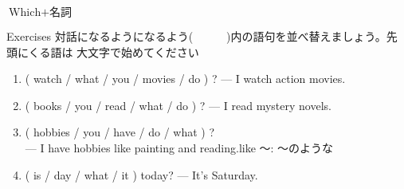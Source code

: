\documentclass[aspectratio=169,xcolor={dvipsnames,table}]{beamer}
\begin{document}
\begin{frame}[plain]{$\text{Which} + \text{名詞}$}
\begin{enumerate}
\end{enumerate}


\end{frame}
\begin{frame}[plain]{Exercises}
 対話になるようになるよう(~~~~~~)内の語句を並べ替えましょう。先頭にくる語は
大文字で始めてください
\begin{enumerate}
 \item ( watch / what / you / movies / do ) ? --- I watch action movies.\\
 \item ( books / you / read / what / do ) ? --- I read mystery novels.\\
 \item ( hobbies / you / have / do / what ) ?\\
\mbox{}\hfill{}--- I have hobbies like painting and reading.\hfill{}{\small like 〜: 〜のような}\\
 \item ( is / day / what / it )  today? --- It's Saturday.\\
\hfill{}
\end{enumerate}

\end{frame}
\end{document}
